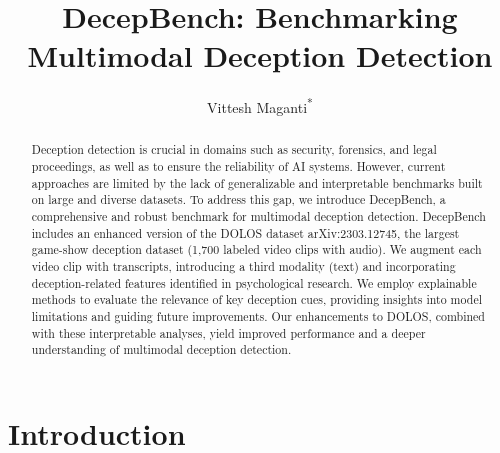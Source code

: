 \documentclass{article} %
\title{DecepBench: Benchmarking Multimodal Deception Detection}
\author{%
\begin{tabular}{c}
Vittesh Maganti\textsuperscript{*}
\end{tabular}%
}
\date{}
\begin{document}
\ifcolmsubmission
\linenumbers
\fi

\maketitle
\thispagestyle{firstpage}
\vspace{-2em}
\begin{center}
\small
\end{center}

\vspace{1.5cm}
\begin{abstract}
Deception detection is crucial in domains such as security, forensics, and legal proceedings, as well as to ensure the reliability of AI systems. However, current approaches are limited by the lack of generalizable and interpretable benchmarks built on large and diverse datasets. To address this gap, we introduce DecepBench, a comprehensive and robust benchmark for multimodal deception detection. DecepBench includes an enhanced version of the DOLOS dataset arXiv:2303.12745, the largest game-show deception dataset (1,700 labeled video clips with audio). We augment each video clip with transcripts, introducing a third modality (text) and incorporating deception-related features identified in psychological research. We employ explainable methods to evaluate the relevance of key deception cues, providing insights into model limitations and guiding future improvements. Our enhancements to DOLOS, combined with these interpretable analyses, yield improved performance and a deeper understanding of multimodal deception detection.
\end{abstract}

\section{Introduction}
\end{document}
